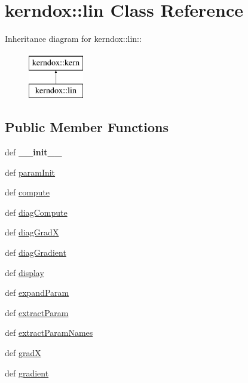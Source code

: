 \hypertarget{classkerndox_1_1lin}{
\section{kerndox::lin Class Reference}
\label{classkerndox_1_1lin}
}
Inheritance diagram for kerndox::lin::\begin{figure}[H]
\begin{center}
\leavevmode
\includegraphics[height=2cm]{classkerndox_1_1lin}
\end{center}
\end{figure}
\subsection*{Public Member Functions}
\begin{CompactItemize}
\item 
\hypertarget{classkerndox_1_1lin_3ae2cb2e4dad731d71caac164caca68c}{
def \textbf{\_\-\_\-init\_\-\_\-}}
\label{classkerndox_1_1lin_3ae2cb2e4dad731d71caac164caca68c}

\item 
def \hyperlink{classkerndox_1_1lin_bb6282f0591600e43e8d0c14ddfa7ee5}{paramInit}
\item 
def \hyperlink{classkerndox_1_1lin_a44fb05c87a84233e7a8592b936debb1}{compute}
\item 
def \hyperlink{classkerndox_1_1lin_0031e74c9acb34a68479ade5f62aa8e3}{diagCompute}
\item 
def \hyperlink{classkerndox_1_1lin_8ea5c54102e2149052b7df6114f16102}{diagGradX}
\item 
def \hyperlink{classkerndox_1_1lin_a86845028577e7d1bed2496250d79d36}{diagGradient}
\item 
def \hyperlink{classkerndox_1_1lin_1920b7faa203c45f748c60a04f3e3493}{display}
\item 
def \hyperlink{classkerndox_1_1lin_1bd885c09b72a881bf508622e6081446}{expandParam}
\item 
def \hyperlink{classkerndox_1_1lin_7b932181554ce33a7f1cbbc3e916a074}{extractParam}
\item 
def \hyperlink{classkerndox_1_1lin_b9112aeafa2c481061e7fa517714ee7b}{extractParamNames}
\item 
def \hyperlink{classkerndox_1_1lin_6841d17e0033af3149d4627acc81fbfd}{gradX}
\item 
def \hyperlink{classkerndox_1_1lin_9681d3870e1bae2e62507c08f5868818}{gradient}
\end{CompactItemize}
